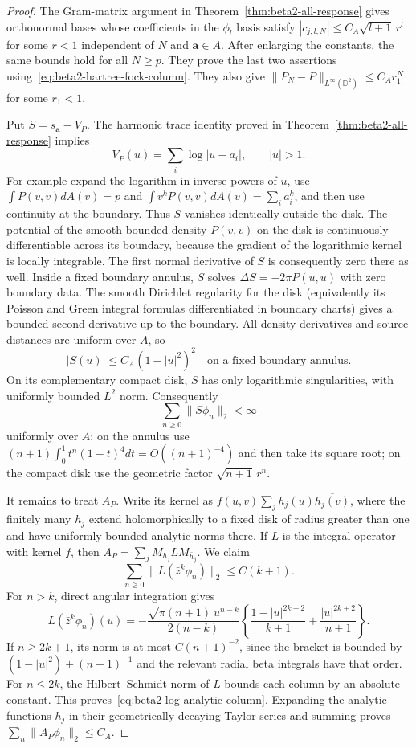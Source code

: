 \documentclass[11pt,a4paper]{article}
\numberwithin{equation}{section}
\theoremstyle{definition}
\theoremstyle{remark}
\newcommand{\D}{\mathbb D}
\begin{document}
\begin{proof}
The Gram-matrix argument in
Theorem~\ref{thm:beta2-all-response} gives orthonormal bases whose
coefficients in the $\phi_l$ basis satisfy
$|c_{j,l,N}|\le C_A\sqrt{l+1}\,r^l$ for some $r<1$ independent
of $N$ and $\mathbf a\in A$.  After enlarging the constants,
the same bounds hold for all $N\ge p$.  They prove the last two
assertions using~\eqref{eq:beta2-hartree-fock-column}.
They also give $\|P_N-P\|_{L^\infty(\D^2)}\le C_A r_1^N$ for
some $r_1<1$.

Put $S=s_{\mathbf a}-V_P$.  The harmonic trace identity proved in
Theorem~\ref{thm:beta2-all-response} implies
\[
 V_P(u)=\sum_i\log|u-a_i|,\qquad |u|>1.
\]
For example expand the logarithm in inverse powers of $u$, use
$\int P(v,v)dA(v)=p$ and
$\int v^kP(v,v)dA(v)=\sum_i a_i^k$, and then use continuity at
the boundary.  Thus $S$ vanishes identically outside the disk.
The potential of the smooth bounded density $P(v,v)$ on the disk
is continuously differentiable across its boundary, because the
gradient of the logarithmic kernel is locally integrable.  The
first normal derivative of $S$ is consequently zero there as well.
Inside a fixed boundary annulus, $S$ solves
$\Delta S=-2\pi P(u,u)$ with zero boundary data.  The smooth
Dirichlet regularity for the disk (equivalently its Poisson and
Green integral formulas differentiated in boundary charts) gives
a bounded second derivative up to the boundary.  All density
derivatives and source distances are uniform over $A$, so
\begin{equation}
 |S(u)|\le C_A(1-|u|^2)^2
 \quad\text{on a fixed boundary annulus}.
 \label{eq:beta2-screened-quadratic-boundary}
\end{equation}
On its complementary compact disk, $S$ has only logarithmic
singularities, with uniformly bounded $L^2$ norm.  Consequently
\[
 \sum_{n\ge0}\|S\phi_n\|_2<\infty
\]
uniformly over $A$: on the annulus use
$(n+1)\int_0^1t^n(1-t)^4dt=O((n+1)^{-4})$ and then take its
square root; on the compact disk use the geometric factor
$\sqrt{n+1}\,r^n$.

It remains to treat $A_P$.  Write its kernel as
$f(u,v)\sum_j h_j(u)\overline{h_j(v)}$, where the finitely many
$h_j$ extend holomorphically to a fixed disk of radius greater
than one and have uniformly bounded analytic norms there.  If
$L$ is the integral operator with kernel $f$, then
$A_P=\sum_jM_{h_j}LM_{\bar h_j}$.  We claim
\begin{equation}
 \sum_{n\ge0}\|L(\bar z^k\phi_n)\|_2\le C(k+1).
 \label{eq:beta2-log-analytic-column}
\end{equation}
For $n>k$, direct angular integration gives
\[
 L(\bar z^k\phi_n)(u)=
 -\frac{\sqrt{\pi(n+1)}\,u^{n-k}}{2(n-k)}
 \left\{\frac{1-|u|^{2k+2}}{k+1}
                    +\frac{|u|^{2k+2}}{n+1}\right\}.
\]
If $n\ge2k+1$, its norm is at most $C(n+1)^{-2}$, since the
bracket is bounded by $(1-|u|^2)+(n+1)^{-1}$ and the relevant
radial beta integrals have that order.  For $n\le2k$, the
Hilbert--Schmidt norm of $L$ bounds each column by an absolute
constant.  This proves~\eqref{eq:beta2-log-analytic-column}.
Expanding the analytic functions $h_j$ in their geometrically
decaying Taylor series and summing proves
$\sum_n\|A_P\phi_n\|_2\le C_A$.


\end{proof}
\end{document}
